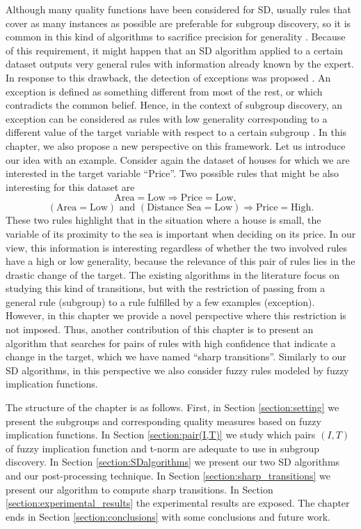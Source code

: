 Although many quality functions have been considered for SD, usually rules that cover as many instances as possible are preferable for subgroup discovery, so it is common in this kind of algorithms to sacrifice precision for generality \cite{Herrera2011}. Because of this requirement, it might happen that an SD algorithm applied to a certain dataset outputs very general rules with information already known by the expert. In response to this drawback, the detection of exceptions was proposed \cite{Hussain2000,Suzuki2004}. An exception is defined as something different from most of the rest, or which contradicts the common belief. Hence, in the context of subgroup discovery, an exception can be considered as rules with low generality corresponding to a different value of the target variable with respect to a certain subgroup \cite{Carmona2013}. In this chapter, we also propose a new perspective on this framework. Let us introduce our idea with an example. Consider again the dataset of houses for which we are interested in the target variable ``Price''. Two possible rules that might be also interesting for this dataset are
$$\text{Area} = \text{Low} \Rightarrow \text{Price} = \text{Low}, \quad$$
$$(\text{Area} = \text{Low}) \text{ and } (\text{Distance Sea} = \text{Low}) \Rightarrow \text{Price} = \text{High}.$$
These two rules highlight that in the situation where a house is small, the variable of its proximity to the sea is important when deciding on its price. In our view, this information is interesting regardless of whether the two involved rules have a high or low generality, because the relevance of this pair of rules lies in the drastic change of the target. The existing algorithms in the literature focus on studying this kind of transitions, but with the restriction of passing from a general rule (subgroup) to a rule fulfilled by a few examples (exception). However, in this chapter we provide a novel perspective where this restriction is not imposed. Thus, another contribution of this chapter is to present an algorithm that searches for pairs of rules with high confidence that indicate a change in the target, which we have named ``sharp transitions''. Similarly to our SD algorithms, in this perspective we also consider fuzzy rules modeled by fuzzy implication functions.

The structure of the chapter is as follows. First, in Section \ref{section:setting} we present the subgroups and corresponding quality measures based on fuzzy implication functions. In Section \ref{section:pair(I,T)} we study which pairs $(I,T)$ of fuzzy implication function and t-norm are adequate to use in subgroup discovery. In Section  \ref{section:SDalgorithms} we present our two SD algorithms and our post-processing technique. In Section \ref{section:sharp_transitions} we present our algorithm to compute sharp transitions. In Section \ref{section:experimental_results} the experimental results are exposed. The chapter ends in Section \ref{section:conclusions} with some conclusions and future work.

